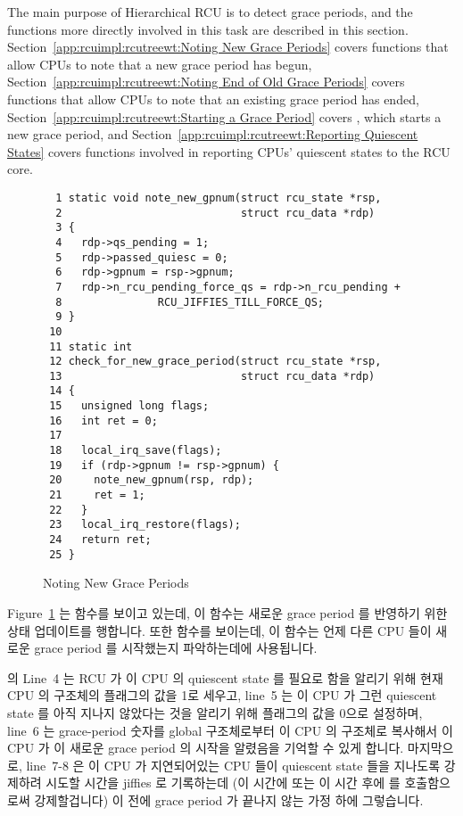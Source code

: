 The main purpose of Hierarchical RCU is to detect grace periods,
and the functions more directly involved in this task are described
in this section.
Section~\ref{app:rcuimpl:rcutreewt:Noting New Grace Periods}
covers functions that allow CPUs to note that a new grace period has
begun,
Section~\ref{app:rcuimpl:rcutreewt:Noting End of Old Grace Periods}
covers functions that allow CPUs to note that an existing grace period
has ended,
Section~\ref{app:rcuimpl:rcutreewt:Starting a Grace Period}
covers , which starts a new grace period, and
Section~\ref{app:rcuimpl:rcutreewt:Reporting Quiescent States}
covers functions involved in reporting CPUs' quiescent states to
the RCU core.
\fi

\begin{figure}[tbp]
{ \scriptsize
\begin{verbatim}
  1 static void note_new_gpnum(struct rcu_state *rsp,
  2                            struct rcu_data *rdp)
  3 {
  4   rdp->qs_pending = 1;
  5   rdp->passed_quiesc = 0;
  6   rdp->gpnum = rsp->gpnum;
  7   rdp->n_rcu_pending_force_qs = rdp->n_rcu_pending +
  8               RCU_JIFFIES_TILL_FORCE_QS;
  9 }
 10
 11 static int
 12 check_for_new_grace_period(struct rcu_state *rsp,
 13                            struct rcu_data *rdp)
 14 {
 15   unsigned long flags;
 16   int ret = 0;
 17
 18   local_irq_save(flags);
 19   if (rdp->gpnum != rsp->gpnum) {
 20     note_new_gpnum(rsp, rdp);
 21     ret = 1;
 22   }
 23   local_irq_restore(flags);
 24   return ret;
 25 }
\end{verbatim}
}
\caption{Noting New Grace Periods}
\label{fig:app:rcuimpl:rcutreewt:Noting New Grace Periods}
\end{figure}

Figure~\ref{fig:app:rcuimpl:rcutreewt:Noting New Grace Periods}
는  함수를 보이고 있는데, 이 함수는 새로운 grace period 를
반영하기 위한 상태 업데이트를 행합니다.  또한 
함수를 보이는데, 이 함수는 언제 다른 CPU 들이 새로운 grace period 를 시작했는지
파악하는데에 사용됩니다.

 의 Line~4 는 RCU 가 이 CPU 의 quiescent state 를 필요로
함을 알리기 위해 현재 CPU 의  구조체의  플래그의
값을 1로 세우고, line~5 는 이 CPU 가 그런 quiescent state 를 아직 지나지
않았다는 것을 알리기 위해  플래그의 값을 0으로 설정하며,
line~6 는 grace-period 숫자를 global  구조체로부터 이 CPU 의
 구조체로 복사해서 이 CPU 가 이 새로운 grace period 의 시작을
알렸음을 기억할 수 있게 합니다.
마지막으로, line~7-8 은 이 CPU 가 지연되어있는 CPU 들이 quiescent state 들을
지나도록 강제하려 시도할 시간을 jiffies 로 기록하는데 (이 시간에 또는 이 시간
후에  를 호출함으로써 강제할겁니다) 이 전에 grace
period 가 끝나지 않는 가정 하에 그렇습니다.
\iffalse

